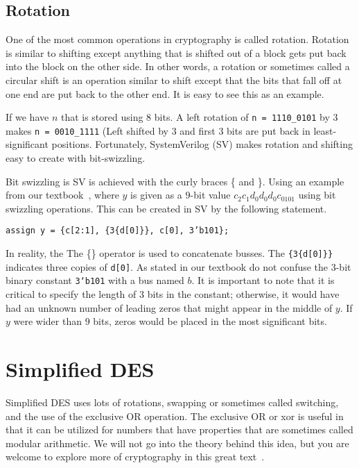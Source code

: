 \documentclass{article}
\begin{document}
\subsection{Rotation}

One of the most common operations in cryptography is called rotation.
Rotation is similar to shifting except anything that is shifted out of
a block gets put back into the block on the other side.  In other
words, a rotation or sometimes called a circular shift is an operation
similar to shift except that the bits that fall off at one end are put
back to the other end.  It is easy to see this as an example.

If we have $n$ that is stored using $8$ bits.
A left rotation of \verb!n = 1110_0101! by $3$ makes
\verb!n = 0010_1111! (Left shifted by 3 and first 3 bits are put back
in least-significant positions.  Fortunately, SystemVerilog (SV) makes
rotation and shifting easy to create with bit-swizzling.

Bit swizzling is SV is achieved with the curly braces \{ and \}.
Using an example from our textbook~\cite{10.5555/2815529}, where $y$ is
given as a $9$-bit value
$c_2c_1d_0d_0d_0c_0101$ using bit swizzling operations.  This can be
created in SV by the following statement.
\begin{verbatim}
assign y = {c[2:1], {3{d[0]}}, c[0], 3’b101};
\end{verbatim}
In reality, the The \{\} operator is used to concatenate busses. The
\verb!{3{d[0]}}! indicates three copies of \verb!d[0]!.
As stated in our textbook do not confuse the $3$-bit binary constant
\verb!3‘b101! with a bus named $b$.
It is important to note that it is critical to specify the length of
$3$ bits in the constant; otherwise, it would have had an unknown
number of leading zeros that might appear in the middle of $y$.
If $y$ were wider than $9$ bits, zeros would be placed in the most
significant bits.

\section{Simplified DES}

Simplified DES uses lots of rotations, swapping or sometimes called
switching, and the use of the exclusive OR operation. The exclusive OR
or xor is useful in that it can be utilized for numbers that have
properties that are sometimes called modular arithmetic.  We will not
go into the theory behind this idea, but you are welcome to explore
more of cryptography in this great text~\cite{10.5555/1721909}.
\end{document}
